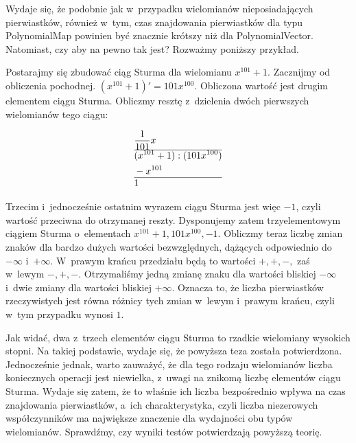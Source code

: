 Wydaje się, że podobnie jak w~przypadku wielomianów nieposiadających pierwiastków, również w~tym, czas znajdowania pierwiastków dla typu PolynomialMap powinien być znacznie krótszy niż dla PolynomialVector. Natomiast, czy aby na pewno tak jest? Rozważmy poniższy przykład.

Postarajmy się zbudować ciąg Sturma dla wielomianu $x^{101}+1$. Zacznijmy od obliczenia pochodnej. $(x^{101}+1)'=101x^{100}$.
Obliczona wartość jest drugim elementem ciągu Sturma. Obliczmy resztę z~dzielenia dwóch pierwszych wielomianów tego ciągu:

\begin{equation*}
\begin{split}
&\frac{1}{101}x \\
\hline
&(x^{101}+1) : (101x^{100}) \\
&-x^{101} \\
\hline
&1
\end{split}
\end{equation*}

Trzecim i~jednocześnie ostatnim wyrazem ciągu Sturma jest więc $-1$, czyli wartość przeciwna do otrzymanej reszty. Dysponujemy zatem trzyelementowym ciągiem Sturma o~elementach ${x^{101}+1, 101x^{100}, -1}$. Obliczmy teraz liczbę zmian znaków dla bardzo dużych wartości bezwzględnych, dążących odpowiednio do $-\infty$ i~$+\infty$. W~prawym krańcu przedziału będą to wartości $+,+,-,$ zaś w~lewym $-,+,-.$ Otrzymaliśmy jedną zmianę znaku dla wartości bliskiej $-\infty$ i~dwie zmiany dla wartości bliskiej $+\infty$. Oznacza to, że liczba pierwiastków rzeczywistych jest równa różnicy tych zmian w~lewym i~prawym krańcu, czyli w~tym przypadku wynosi $1$.

Jak widać, dwa z~trzech elementów ciągu Sturma to rzadkie wielomiany wysokich stopni. Na takiej podstawie, wydaje się, że powyższa teza została potwierdzona. Jednocześnie jednak, warto zauważyć, że dla tego rodzaju wielomianów liczba koniecznych operacji jest niewielka, z~uwagi na znikomą liczbę elementów ciągu Sturma. Wydaje się zatem, że to właśnie ich liczba bezpośrednio wpływa na czas znajdowania pierwiastków, a~ich charakterystyka, czyli liczba niezerowych współczynników ma największe znaczenie dla wydajności obu typów wielomianów. Sprawdźmy, czy wyniki testów potwierdzają powyższą teorię.

